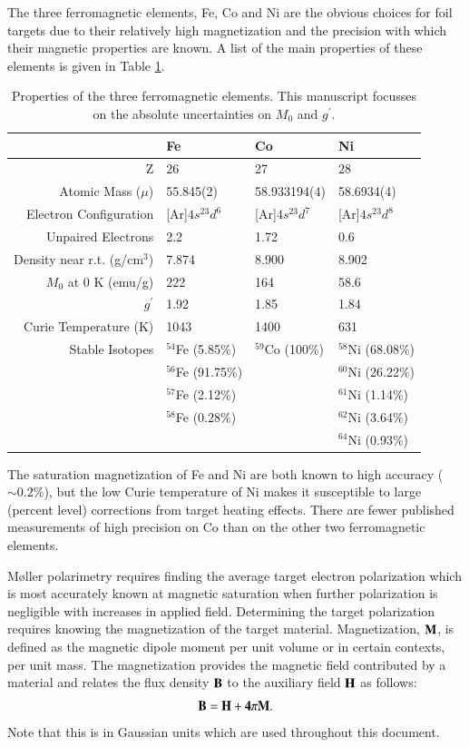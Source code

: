 \documentclass[preprint,12pt]{elsarticle}
\begin{document}
The three ferromagnetic elements, Fe, Co and Ni are the obvious choices for foil targets due to their relatively high magnetization and the precision with which their magnetic properties are known. A list of the main properties of these elements is given in Table \ref{tab:ferro_elem}.
\begin{table}[]
\caption{\label{tab:ferro_elem}Properties of the three ferromagnetic elements. This manuscript focusses on the absolute uncertainties on $M_0$ and $g^\prime$.}
\begin{center}
\begin{tabular}{|r|l|l|l|}\hline
~&Fe&Co&Ni\\\hline
Z&26&27&28\\
Atomic Mass ($\mu$)&55.845(2)&58.933194(4)&58.6934(4)\\
Electron Configuration&[Ar]$4s^23d^6$&[Ar]$4s^23d^7$&[Ar]$4s^23d^8$ \\
Unpaired Electrons&2.2&1.72&0.6\\
Density near r.t. (g/cm$^3$)&7.874&8.900&8.902\\
$M_0$ at 0 K (emu/g)&222&164&58.6\\
$g^{\prime}$&1.92&1.85&1.84\\
Curie Temperature (K)& 1043&1400&631\\\hline
Stable Isotopes & $^{54}$Fe (5.85\%)& $^{59}$Co (100\%)&$^{58}$Ni (68.08\%)\\
~&$^{56}$Fe (91.75\%)&~&$^{60}$Ni (26.22\%)\\
~&$^{57}$Fe (2.12\%)&~&$^{61}$Ni (1.14\%)\\
~&$^{58}$Fe (0.28\%)&~&$^{62}$Ni (3.64\%)\\
~&~&~&$^{64}$Ni (0.93\%)\\\hline
\end{tabular}
\end{center}
\end{table}
The saturation magnetization of Fe and Ni are both known to high accuracy ($\sim0.2\%$), but the low Curie temperature of Ni makes it susceptible to large (percent level) corrections from target heating effects. There are fewer published measurements of high precision on Co than on the other two ferromagnetic elements.

M\o ller polarimetry requires finding the average target electron polarization which is most accurately known at magnetic saturation when further polarization is negligible with increases in applied field. Determining the target polarization requires knowing the magnetization of the target material. Magnetization, $\bf M$, is defined as the magnetic dipole moment per unit volume or in certain contexts, per unit mass. The magnetization provides the magnetic field contributed by a material and relates the flux density $\bf B$ to the auxiliary field $\bf H$ as follows:
\[
\bf{B}=\bf{H}+4\pi\bf{M}.
\]
Note that this is in Gaussian units which are used throughout this document.
\end{document}
